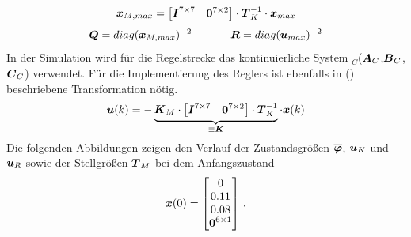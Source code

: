 \begin{equation}
\boldsymbol{x}_{M,max} = \begin{bmatrix}
\boldsymbol{I}^{7\times 7} & \boldsymbol{0}^{7\times 2}
\end{bmatrix}\cdot \boldsymbol{T}^{-1}_K \cdot \boldsymbol{x}_{max}
\label{eq_xred}
\end{equation}
\begin{equation}
\boldsymbol{Q} = diag(\boldsymbol{x}_{M,max})^{-2} \hspace{35pt} \boldsymbol{R} = diag(\boldsymbol{u}_{max})^{-2}
\end{equation}
In der Simulation wird für die Regelstrecke das kontinuierliche System $_C$($\boldsymbol{A}_C$,$\boldsymbol{B}_C$,$\boldsymbol{C}_C$) verwendet. Für die Implementierung des Reglers ist ebenfalls in (\cite{eq_xred}) beschriebene Transformation nötig.
\begin{equation}
\boldsymbol{u}(k) = -\underbrace{\boldsymbol{K}_M\cdot \begin{bmatrix}
\boldsymbol{I}^{7\times 7} & \boldsymbol{0}^{7\times 2}
\end{bmatrix} \cdot \boldsymbol{T}^{-1}_K}_{\equiv \boldsymbol{K}} \cdot \boldsymbol{x}(k)
\end{equation}
Die folgenden Abbildungen zeigen den Verlauf der Zustandsgrößen $\boldsymbol{\overline{\varphi}}$, $\boldsymbol{u}_K$ und $\boldsymbol{u}_R$ sowie der Stellgrößen $\boldsymbol{T}_M$ bei dem Anfangszustand
\begin{equation}
\boldsymbol{x}(0) = \begin{bmatrix}
0 \\ 0.11 \\ 0.08 \\ \boldsymbol{0}^{6\times 1}
\end{bmatrix}\,.
\end{equation}
